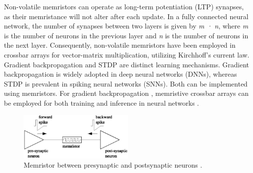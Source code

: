 
\noindent Non-volatile memristors can operate as long-term potentiation (LTP) synapses, as their memristance will not alter after each update. In a fully connected neural network, the number of synapses between two layers is given by \textit{m · n}, where \textit{m} is the number of neurons in the previous layer and \textit{n} is the number of neurons in the next layer. Consequently, non-volatile memristors have been employed in crossbar arrays for vector-matrix multiplication, utilizing Kirchhoff's current law.\\



\noindent Gradient backpropagation and STDP are distinct learning mechanisms. Gradient backpropagation is widely adopted in deep neural networks (DNNs), whereas STDP is prevalent in spiking neural networks (SNNs). Both can be implemented using memristors. For gradient backpropagation \cite{hasan2017chip}, memristive crossbar arrays can be employed for both training and inference in neural networks \cite{ankit2019puma}.\\

\begin{figure}[htbp!] 
    \centering    
    \includegraphics[width=0.5\textwidth]{Chapter6/Figs/d.png}
    \caption[Memristor between presynaptic and postsynaptic neurons.]{Memristor between presynaptic and postsynaptic neurons \cite{huang2018memristor}.}
    \label{fig:6d}
\end{figure}

